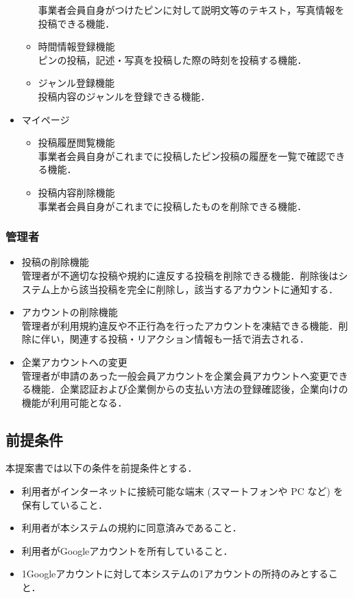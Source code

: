 \begin{itemize}[itemsep=10pt]
\begin{itemize}[itemsep=10pt]
        事業者会員自身がつけたピンに対して説明文等のテキスト，写真情報を投稿できる機能．
        \item 時間情報登録機能 \mbox{}\\
        ピンの投稿，記述・写真を投稿した際の時刻を投稿する機能．
        \item ジャンル登録機能 \mbox{}\\
        投稿内容のジャンルを登録できる機能．
    \end{itemize}
    \item マイページ
    \begin{itemize}[itemsep=10pt]
        \item 投稿履歴閲覧機能 \mbox{}\\
        事業者会員自身がこれまでに投稿したピン投稿の履歴を一覧で確認できる機能．
        \item 投稿内容削除機能 \mbox{}\\
        事業者会員自身がこれまでに投稿したものを削除できる機能．
    \end{itemize}
\end{itemize}

\subsubsection{管理者}
\begin{itemize}[itemsep=10pt]
    \item 投稿の削除機能 \mbox{}\\
    管理者が不適切な投稿や規約に違反する投稿を削除できる機能．削除後はシステム上から該当投稿を完全に削除し，該当するアカウントに通知する．
    \item アカウントの削除機能 \mbox{}\\
    管理者が利用規約違反や不正行為を行ったアカウントを凍結できる機能．削除に伴い，関連する投稿・リアクション情報も一括で消去される．
    \item 企業アカウントへの変更 \mbox{}\\
    管理者が申請のあった一般会員アカウントを企業会員アカウントへ変更できる機能．企業認証および企業側からの支払い方法の登録確認後，企業向けの機能が利用可能となる．
\end{itemize}

\subsection{前提条件}
本提案書では以下の条件を前提条件とする．
\begin{itemize}
    \item 利用者がインターネットに接続可能な端末 (スマートフォンや PC など) を保有していること．
    \item 利用者が本システムの規約に同意済みであること．
    \item 利用者がGoogleアカウントを所有していること．
    \item 1Googleアカウントに対して本システムの1アカウントの所持のみとすること．
\end{itemize}


